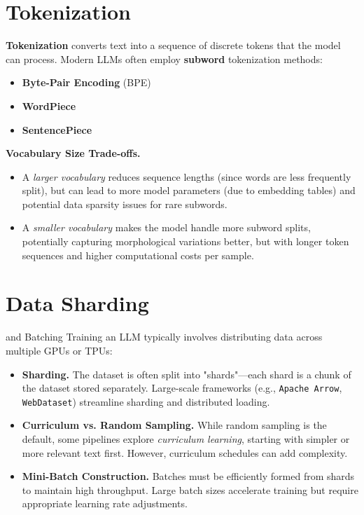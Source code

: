 \section{Tokenization}
\noindent
\textbf{Tokenization} converts text into a sequence of discrete tokens that the model can process. Modern LLMs often employ \textbf{subword} tokenization methods:
\begin{itemize}
    \item \textbf{Byte-Pair Encoding} (BPE)
    \item \textbf{WordPiece}
    \item \textbf{SentencePiece}
\end{itemize}

\noindent
\textbf{Vocabulary Size Trade-offs.}
\begin{itemize}
    \item A \emph{larger vocabulary} reduces sequence lengths (since words are less frequently split), but can lead to more model parameters (due to embedding tables) and potential data sparsity issues for rare subwords.
    \item A \emph{smaller vocabulary} makes the model handle more subword splits, potentially capturing morphological variations better, but with longer token sequences and higher computational costs per sample.
\end{itemize}

\section{Data Sharding} and Batching
\noindent
Training an LLM typically involves distributing data across multiple GPUs or TPUs:
\begin{itemize}
    \item \textbf{Sharding.} The dataset is often split into "shards"—each shard is a chunk of the dataset stored separately. Large-scale frameworks (e.g., \texttt{Apache Arrow}, \texttt{WebDataset}) streamline sharding and distributed loading.
    \item \textbf{Curriculum vs. Random Sampling.} While random sampling is the default, some pipelines explore \emph{curriculum learning}, starting with simpler or more relevant text first. However, curriculum schedules can add complexity.
    \item \textbf{Mini-Batch Construction.} Batches must be efficiently formed from shards to maintain high throughput. Large batch sizes accelerate training but require appropriate learning rate adjustments.
\end{itemize}

